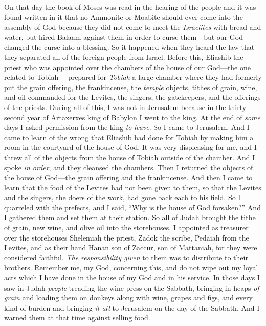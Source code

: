 \begin{biblechapter} %
 On that day the book of Moses was read in the hearing of the people and it was found written in it that no Ammonite or Moabite should ever come into the assembly of God
\verse because they did not come to meet the \textit{Israelites} with bread and water, but hired Balaam against them in order to curse them—but our God changed the curse into a blessing.
\verse So it happened when they heard the law that they separated all of the foreign people from Israel.
 Before this, Eliashib the priest who was appointed over the chambers of the house of our God—the one related to Tobiah—
\verse prepared for \textit{Tobiah} a large chamber where they had formerly put the grain offering, the frankincense, the \textit{temple} objects, tithes of grain, wine, and oil commanded for the Levites, the singers, the gatekeepers, and the offerings of the priests.
\verse During all of this, I was not in Jerusalem because in the thirty-second year of Artaxerxes king of Babylon I went to the king. At the end of \textit{some} days I asked permission from the king \textit{to leave}.
\verse So I came to Jerusalem. And I came to learn of the wrong that Eliashib had done for Tobiah by making him a room in the courtyard of the house of God.
\verse It was very displeasing for me, and I threw all of the objects from the house of Tobiah outside of the chamber.
\verse And I spoke \textit{in order}, and they cleansed the chambers. Then I returned the objects of the house of God—the grain offering and the frankincense.
\verse And then I came to learn that the food of the Levites had not been given to them, so that the Levites and the singers, the doers of the work, had gone back each to his field.
\verse So I quarreled with the prefects, and I said, “Why is the house of God forsaken?” And I gathered them and set them at their station.
\verse So all of Judah brought the tithe of grain, new wine, and olive oil into the storehouses.
\verse I appointed as treasurer over the storehouses Shelemiah the priest, Zadok the scribe, Pedaiah from the Levites, and as their hand Hanan son of Zaccur, son of Mattaniah, for they were considered faithful. \textit{The responsibility given} to them was to distribute to their brothers.
\verse Remember me, my God, concerning this, and do not wipe out my loyal acts which I have done in the house of my God and in his service.
 In those days I saw in Judah \textit{people} treading the wine press on the Sabbath, bringing in heaps \textit{of grain} and loading them on donkeys along with wine, grapes and figs, and every kind of burden and bringing \textit{it all} to Jerusalem on the day of the Sabbath. And I warned them at that time against selling food.

\end{biblechapter}
